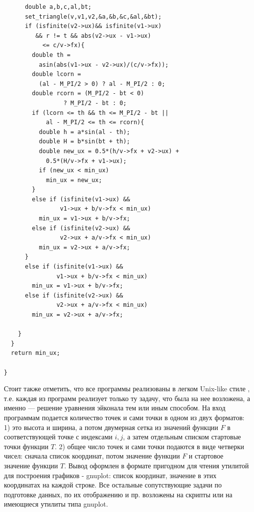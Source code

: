\begin{verbatim}
      double a,b,c,al,bt;
      set_triangle(v,v1,v2,&a,&b,&c,&al,&bt);
      if (isfinite(v2->ux)&& isfinite(v1->ux) 
         && r != t && abs(v2->ux - v1->ux)
           <= c/v->fx){
        double th = 
          asin(abs(v1->ux - v2->ux)/(c/v->fx));
        double lcorn = 
          (al - M_PI/2 > 0) ? al - M_PI/2 : 0;
        double rcorn = (M_PI/2 - bt < 0) 
                 ? M_PI/2 - bt : 0;
        if (lcorn <= th && th <= M_PI/2 - bt || 
            al - M_PI/2 <= th <= rcorn){
          double h = a*sin(al - th);
          double H = b*sin(bt + th);
          double new_ux = 0.5*(h/v->fx + v2->ux) +
            0.5*(H/v->fx + v1->ux);
          if (new_ux < min_ux)
            min_ux = new_ux;
        }
        else if (isfinite(v1->ux) && 
                v1->ux + b/v->fx < min_ux)
          min_ux = v1->ux + b/v->fx;
        else if (isfinite(v2->ux) && 
                v2->ux + a/v->fx < min_ux)
          min_ux = v2->ux + a/v->fx;
      }
      else if (isfinite(v1->ux) && 
               v1->ux + b/v->fx < min_ux)
        min_ux = v1->ux + b/v->fx;
      else if (isfinite(v2->ux) && 
               v2->ux + a/v->fx < min_ux)
        min_ux = v2->ux + a/v->fx;

    }
  }
  return min_ux;

}

\end{verbatim}
\large

Стоит также отметить, что все программы реализованы в легком Unix-like
стиле \cite{AP2016}, т.е. каждая из программ реализует только ту задачу, что была на
нее возложена, а именно --- решение уравнения эйконала тем или иным
способом. На вход программам подается количество точек и сами точки в
одном из двух форматов: 1) это высота и ширина, а
потом двумерная сетка из значений функции $F$ в соответствующей точке
с индексами $i,j$, а затем отдельным списком стартовые точки функции $T$.
2) общее число точек и сами точки подаются в виде четверки чисел:
сначала список координат, потом значение функции $F$ и стартовое
значение функции $T$.
Вывод оформлен в формате пригодном для чтения утилитой для построения
графиков - gnuplot: список координат, значение в этих координатах на
каждой строке.
Все остальные сопутствующие задачи по подготовке данных, по их
отображению и пр. возложены на скрипты или на имеющиеся утилиты типа
gnuplot. 


